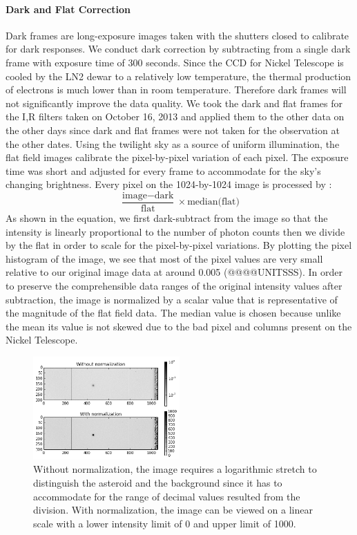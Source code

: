 \documentclass[authoryear, 12pt,5p, times]{elsarticle}
\begin{document}
		\paragraph{\textbf{Dark and Flat Correction}}
	Dark frames are long-exposure images taken with the shutters closed to calibrate for dark responses. We conduct dark correction by subtracting from a single dark frame with  exposure time of 300 seconds. Since the CCD for Nickel Telescope is cooled by the LN2 dewar to a relatively low temperature, the thermal production of electrons is much lower than in room temperature. Therefore dark frames will not significantly improve the data quality. We took the dark and flat frames for the I,R filters taken on October 16, 2013  and applied them to the other data on the other days since dark and flat frames were not taken for the observation at the other dates. Using the twilight sky as a source of uniform illumination, the flat field images calibrate the pixel-by-pixel variation of each pixel. The exposure time was short and adjusted for every frame to accommodate for the sky's changing brightness. Every pixel on the 1024-by-1024 image is processed by : 
			\begin{equation}
			\frac{\text{image}-\text{dark}}{\text{flat}}\times\text{median(flat)}
			\end{equation}
		 As shown in the equation, we first dark-subtract from the image so that the intensity is linearly proportional to the number of photon counts then we divide by the flat in order to scale for the pixel-by-pixel variations. By plotting the pixel histogram of the image, we see that most of the pixel values are very small relative to our original image data at around 0.005 (@@@@UNITSSS). In order to preserve the comprehensible data ranges of the original intensity values after subtraction,  the image is normalized by a scalar value that is representative of the magnitude of the flat field data. The median value is chosen because unlike the mean its value is not skewed due to the bad pixel and columns present on the Nickel Telescope.

	\begin{figure}[h!]
\includegraphics[width=0.5\textwidth]{figures/normalization}
\caption{Without normalization, the image requires a logarithmic stretch to distinguish the asteroid and the background since it has to accommodate for the range of decimal values resulted from the division. With normalization, the image can be viewed on a linear scale with a lower intensity limit of 0 and upper limit of 1000.}
\label{normalization}
\end{figure}
\end{document}
